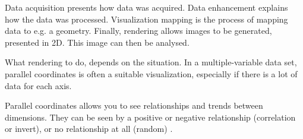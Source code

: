 Data acquisition presents how data was acquired. Data enhancement explains how the data was processed. Visualization mapping is the process of mapping data to e.g. a geometry. Finally, rendering allows images to be generated, presented in 2D. This image can then be analysed.

What rendering to do, depends on the situation. In a multiple-variable data set, parallel coordinates is often a suitable visualization, especially if there is a lot of data for each axis.

Parallel coordinates allows you to see relationships and trends between dimensions. They can be seen by a positive or negative relationship (correlation or invert), or no relationship at all (random) \cite{une-terre}.
